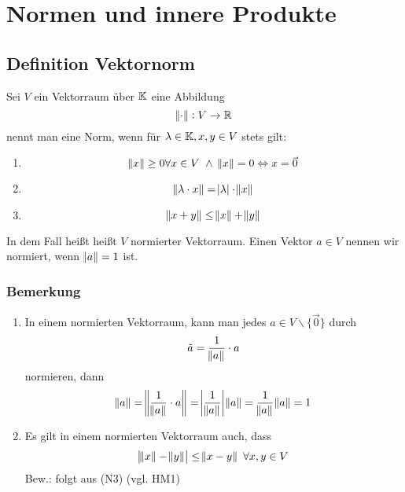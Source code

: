 \section{Normen und innere Produkte}
\subsection{Definition Vektornorm}
Sei $V$ ein Vektorraum über $\mathbb{K}$ eine Abbildung
\begin{equation*}
	\norm{\cdot}: V \rightarrow \mathbb{R}
\end{equation*}
nennt man eine Norm, wenn für $\lambda \in \mathbb{K}, x, y \in V$  stets gilt:
\begin{enumerate}[label= (\alph*)]
	\item 
		\begin{equation*}
			\norm{x} \geq 0 \forall x \in V\ \land\ \norm{x} = 0 \Leftrightarrow x = \vec{0}
		\end{equation*}
	\item 
		\begin{equation*}
			\norm{\lambda \cdot x} = \abs{\lambda} \cdot \norm{x}
		\end{equation*}
	\item
		\begin{equation*}
			\norm{x + y } \leq \norm{x} + \norm{y}
		\end{equation*}
\end{enumerate}
In dem Fall heißt heißt $V$ normierter Vektorraum. Einen Vektor $a \in V$ nennen wir normiert, wenn $\norm{a} = 1$ ist.
\subsubsection{Bemerkung}
\begin{enumerate}
	\item In einem normierten Vektorraum, kann man jedes $a \in V \backslash \{\vec{0}\}$ durch
		\begin{equation*}
			\tilde{a} = \frac{1}{\norm{a}} \cdot a
		\end{equation*}
		normieren, dann
		\begin{equation*}
			\norm{a} = \norm{\frac{1}{\norm{a}} \cdot a} = \abs{\frac{1}{\norm{a}}} \norm{a} = \frac{1}{\norm{a}} \norm{a} = 1
		\end{equation*}
	\item Es gilt in einem normierten Vektorraum auch, dass
		\begin{equation*}
			\abs{\norm{x} - \norm{y}} \leq \norm{x - y}\ \forall x,y \in V
		\end{equation*}
		Bew.: folgt aus (N3) (vgl. HM1)
\end{enumerate}

